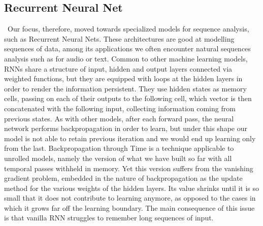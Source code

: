 \documentclass[12pt]{article}
\begin{document}
\subsection*{Recurrent Neural Net}
\begin{flushright}
  \begin{minipage}[t]{0.96\linewidth}\
    Our focus, therefore, moved towards specialized models for sequence analysis, such as Recurrent Neural Nets. These architectures are good at modelling sequences of data, among its applications we  often encounter natural sequences analysis such as for audio or text. Common to other machine learning models, RNNs share a structure of input, hidden and output layers connected via weighted functions, but they are equipped with loops at the hidden layers in order to render the information persistent. They use hidden states as memory cells, passing on each of their outputs to the following cell, which vector is then concatenated with the following input, collecting information coming from previous states. As with other models, after each forward pass, the neural network performs backpropagation in order to learn, but under this shape our model is not able to retain previous iteration and we would end up learning only from the last. Backpropagation through Time is a technique applicable to unrolled models, namely the version of what we have built so far with all temporal passes withheld in memory. Yet this version suffers from the vanishing gradient problem, embedded in the nature of backpropagation as the update method for the various weights of the hidden layers. Its value shrinks until it is so small that it does not contribute to learning anymore, as opposed to the cases in which it grows far off the learning boundary. The main consequence of this issue is that vanilla RNN struggles to remember long sequences of input.
  \end{minipage}
\end{flushright}
\end{document}
